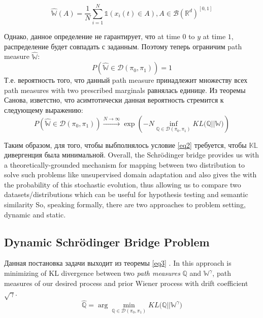 \documentclass{article}
\begin{document}
\begin{equation} \label{eq1}   
    \hat{\mathbb{W}}(A)=\frac{1}{N}\sum_{i=1}^N\mathds{1}\left(x_i(t)\in A\right), A\in \mathcal{B}(\mathbb{R}^d)^{[0,1]}
\end{equation}


Однако, данное определение не гарантирует, что at time $0$ to $y$ at time $1$, распределение будет совпадать с заданным. Поэтому теперь ограничим path measure $\hat{\mathbb{W}}$:
\begin{equation} \label{eq2}
    P\left(\hat{\mathbb{W}} \in \mathcal{D}(\pi_0, \pi_1)\right)=1
\end{equation}
Т.е. вероятность того, что данный path measure принадлежит множеству всех path measures with two prescribed marginals равнялась единице. Из теоремы Санова, изветстно, что асимтотически данная вероятность стремится к следующему выражению:
\begin{equation} \label{eq3}
    P\left(\hat{\mathbb{W}} \in \mathcal{D}(\pi_0, \pi_1)\right) \xrightarrow{N\rightarrow \infty} \exp\left(-N\inf_{\mathbb{Q} \in \mathcal{D}(\pi_0, \pi_1)}KL\mathbb{(Q||W})\right)
\end{equation}

Таким образом, для того, чтобы выбполнялось условие \ref{eq2} требуется, чтобы $\mathbb{KL}$ дивергенция была минимальной.
Overall, the Schrödinger bridge provides us with a theoretically-grounded mechanism for mapping between two distribution to solve such problems like unsupervised domain adaptation and also gives the with the probability of this stochastic evolution, thus allowing us to compare two datasets/distributions which can be useful for hypothesis testing and semantic similarity
So, speaking formally, there are two approaches to problem setting, dynamic and static.
\subsection{Dynamic Schrödinger Bridge Problem}
Данная постановка задачи выходит из теоремы \ref{eq3} . In this approach is minimizing of KL divergence between two \textit{path measures} $\mathbb{Q}$ and $\mathbb{W}^\gamma$, path measures of our desired process and prior Wiener process with drift coefficient $\sqrt\gamma$.
\begin{equation}\label{dyn}
    \hat{\mathbb{Q}} = \arg\min_{\mathbb{Q}\in \mathcal{D}(\pi_0, \pi_1)} KL\mathbb{(Q||W}^\gamma)
\end{equation}
\end{document}
